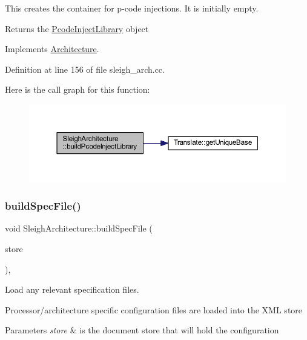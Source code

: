 This creates the container for p-\/code injections. It is initially empty. \begin{DoxyReturn}{Returns}
the \mbox{\hyperlink{class_pcode_inject_library}{Pcode\+Inject\+Library}} object 
\end{DoxyReturn}


Implements \mbox{\hyperlink{class_architecture_a7dae4f59e2c196a623b45e68cacc1a7a}{Architecture}}.



Definition at line 156 of file sleigh\+\_\+arch.\+cc.

Here is the call graph for this function\+:
\nopagebreak
\begin{figure}[H]
\begin{center}
\leavevmode
\includegraphics[width=350pt]{class_sleigh_architecture_ae0b7773ee748ea290358c389e71f2003_cgraph}
\end{center}
\end{figure}
\mbox{\label{class_sleigh_architecture_a80e8e72ca0059be816575262b7db395f}} 
\subsubsection{\texorpdfstring{buildSpecFile()}{buildSpecFile()}}
{\footnotesize\ttfamily void Sleigh\+Architecture\+::build\+Spec\+File (\begin{DoxyParamCaption}\item[{\mbox{\hyperlink{class_document_storage}{Document\+Storage}} \&}]{store }\end{DoxyParamCaption})\hspace{0.3cm}{\ttfamily [protected]}, {\ttfamily [virtual]}}



Load any relevant specification files. 

Processor/architecture specific configuration files are loaded into the X\+ML store 
\begin{DoxyParams}{Parameters}
{\em store} & is the document store that will hold the configuration \\
\hline
\end{DoxyParams}


